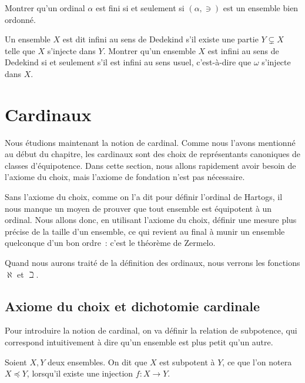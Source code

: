 \begin{exercise}
  Montrer qu'un ordinal $\alpha$ est fini si et seulement si $(\alpha,\ni)$ est
  un ensemble bien ordonné.
\end{exercise}

\begin{exercise}
  Un ensemble $X$ est dit infini au sens de Dedekind s'il existe une partie
  $Y\subsetneq X$ telle que $X$ s'injecte dans $Y$. Montrer qu'un ensemble $X$
  est infini au sens de Dedekind si et seulement s'il est infini au sens usuel,
  c'est-à-dire que $\omega$ s'injecte dans $X$.
\end{exercise}

\section{Cardinaux}

Nous étudions maintenant la notion de cardinal. Comme nous l'avons mentionné
au début du chapitre, les cardinaux sont des choix de représentants canoniques
de classes d'équipotence. Dans cette section, nous allons rapidement avoir
besoin de l'axiome du choix, mais l'axiome de fondation n'est pas nécessaire.

Sans l'axiome du choix, comme on l'a dit pour définir l'ordinal de Hartogs, il
nous manque un moyen de prouver que tout ensemble est équipotent à un ordinal.
Nous allons donc, en utilisant l'axiome du choix, définir une mesure plus
précise de la taille d'un ensemble, ce qui revient au final à munir un ensemble
quelconque d'un bon ordre~: c'est le théorème de Zermelo.

Quand nous aurons traité de la définition des ordinaux, nous verrons les
fonctions $\aleph$ et $\beth$.

\subsection{Axiome du choix et dichotomie cardinale}

Pour introduire la notion de cardinal, on va définir la relation de subpotence,
qui correspond intuitivement à dire qu'un ensemble est plus petit qu'un autre.

\begin{definition}[Subpotence]
  Soient $X,Y$ deux ensembles. On dit que $X$ est subpotent à $Y$, ce que l'on
  notera $X\preceq Y$, lorsqu'il existe une injection $f : X \to Y$.
\end{definition}

